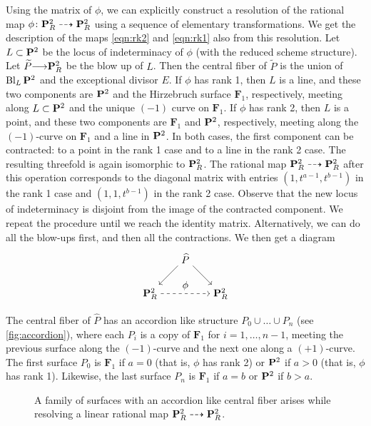 \documentclass[12pt,reqno]{amsart}
\DeclareMathOperator{\Bl}{Bl}
\renewcommand{\to}{{\longrightarrow}}
\numberwithin{equation}{section}
\newcommand{\F}{\mathbf F}
\begin{document}
Using the matrix of $\phi$, we can explicitly construct a resolution of the rational map $\phi \colon \P^2_R \dashrightarrow \P^2_R$ using a sequence of elementary transformations.
We get the description of the maps \eqref{eqn:rk2} and \eqref{eqn:rk1} also from this resolution.
Let $L \subset \P^2$ be the locus of indeterminacy of $\phi$ (with the reduced scheme structure).
Let $\widetilde P \to \P^2_R$ be the blow up of $L$.
Then the central fiber of $\widetilde P$ is the union of $\Bl_L\P^2$ and the exceptional divisor $E$.
If $\phi$ has rank 1, then $L$ is a line, and these two components are $\P^2$ and the Hirzebruch surface $\F_1$, respectively, meeting along $L \subset \P^2$ and the unique $(-1)$ curve on $\F_1$.
If $\phi$ has rank 2, then $L$ is a point, and these two components are $\F_1$ and $\P^2$, respectively, meeting along the $(-1)$-curve on $\F_1$ and a line in $\P^2$.
In both cases, the first component can be contracted: to a point in the rank 1 case and to a line in the rank 2 case.
The resulting threefold is again isomorphic to $\P^2_R$.
The rational map $\P^2_R \dashrightarrow \P^2_R$ after this operation corresponds to the diagonal matrix with entries $(1,t^{a-1}, t^{b-1})$ in the rank 1 case and $(1, 1, t^{b-1})$ in the rank 2 case.
Observe that the new locus of indeterminacy is disjoint from the image of the contracted component.
We repeat the procedure until we reach the identity matrix.
Alternatively, we can do all the blow-ups first, and then all the contractions.
We then get a diagram
\[
\begin{tikzpicture}[node distance=5em]
  \node (t) {$\widehat P$};
  \node (l) [below left of=t] {$\P^2_R$};
  \node (r) [below right of=t] {$\P^2_R$};
  \path [->] (l) edge[dashed]  node[above] {$\phi$}  (r) (t) edge (l) (t) edge (r);
\end{tikzpicture}
\]
The central fiber of $\widehat P$ has an accordion like structure $P_0 \cup \dots \cup P_n$ (see \autoref{fig:accordion}), where each $P_i$ is a copy of $\F_1$ for $i = 1, \dots, n-1$, meeting the previous surface along the $(-1)$-curve and the next one along a $(+1)$-curve.
The first surface $P_0$ is $\F_1$ if $a = 0$ (that is, $\phi$ has rank 2) or $\P^2$ if $a > 0$ (that is, $\phi$ has rank 1).
Likewise, the last surface $P_n$ is $\F_1$ if $a = b$ or $\P^2$ if $b > a$.

\begin{figure}
  \centering
  
  \caption{A family of surfaces with an accordion like central fiber arises while resolving a linear rational map $\P^2_R \dashrightarrow \P^2_R$.}
  \label{fig:accordion}
\end{figure}
\end{document}
